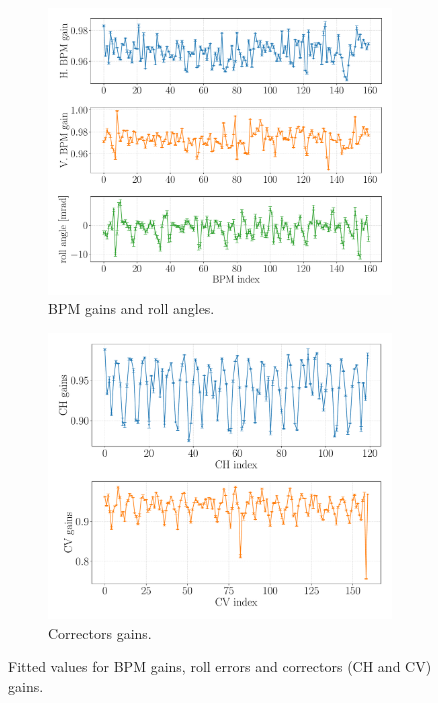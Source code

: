\begin{figure}
\centering
\begin{subfigure}[t]{0.49\textwidth}
\includegraphics[width=1.0\textwidth]{figures/bpm_gains_iter0_big.pdf}
    \caption{BPM gains and roll angles.}
    \label{subfig:bpm_fit}
\end{subfigure}
 \begin{subfigure}[t]{0.49\textwidth}
\includegraphics[width=1.0\textwidth]{figures/corr_gains_iter0_big.pdf}
    \caption{Correctors gains.}
    \label{subfig:corr_fit}
\end{subfigure}
\caption{Fitted values for BPM gains, roll errors and correctors (CH and CV) gains.}
\label{fig:gain_fit}
\end{figure}

